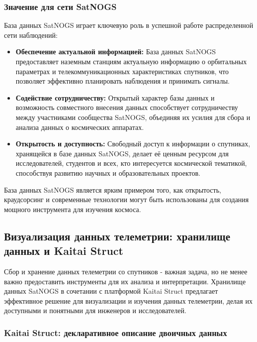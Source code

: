 \documentclass[14pt, a4paper]{extreport}
\begin{document}
    \subsubsection{Значение для сети SatNOGS}

    База данных SatNOGS играет ключевую роль в успешной работе распределенной сети наблюдений:

    \begin{itemize}
        \item \textbf{Обеспечение актуальной информацией:} База данных SatNOGS предоставляет наземным станциям актуальную информацию о орбитальных параметрах и телекоммуникационных характеристиках спутников, что позволяет эффективно планировать наблюдения и принимать сигналы.
        \item \textbf{Содействие сотрудничеству:} Открытый характер базы данных и возможность совместного внесения данных способствует сотрудничеству между участниками сообщества SatNOGS, объединяя их усилия для сбора и анализа данных о космических аппаратах.
        \item \textbf{Открытость и доступность:} Свободный доступ к информации о спутниках, хранящейся в базе данных SatNOGS, делает её ценным ресурсом для исследователей, студентов и всех, кто интересуется космической тематикой, способствуя развитию научных и образовательных проектов.
    \end{itemize}

    База данных SatNOGS является ярким примером того, как открытость, краудсорсинг и современные технологии могут быть использованы для создания мощного инструмента для изучения космоса.

    \subsection{Визуализация данных телеметрии: хранилище данных и Kaitai Struct}

    Сбор и хранение данных телеметрии со спутников - важная задача, но не менее важно предоставить инструменты для их анализа и интерпретации.
    Хранилище данных SatNOGS в сочетании с платформой Kaitai Struct предлагает эффективное решение для визуализации и изучения данных телеметрии, делая их доступными и понятными для инженеров и исследователей.

    \subsubsection{Kaitai Struct: декларативное описание двоичных данных}
\end{document}
